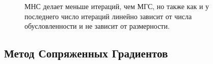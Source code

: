 \documentclass[a4paper,12pt]{article}
\begin{document}
\begin{figure}[h]
\caption{МНС делает меньше итераций, чем  МГС, но также как и у последнего число итераций линейно зависит от числа обусловленности и не зависит от размерности.}
\end{figure}

\clearpage

\subsection{Метод Сопряженных Градиентов}
\end{document}

